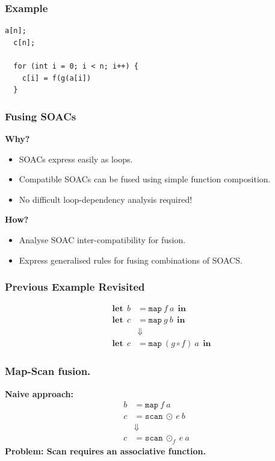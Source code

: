 \documentclass{beamer}
\newcommand\lett{\phantom{-}\:\:\mathbf{let}\:\:}
\newcommand\inn{\:\:\mathbf{in}\:\:}
\begin{document}
\begin{frame}[fragile]
  \frametitle{Example}
\begin{lstlisting}[caption=Producer-Consumer post-fusion.,label={lst:pc-post}] 
  a[n];
  c[n];

  for (int i = 0; i < n; i++) {
    c[i] = f(g(a[i])
  }
\end{lstlisting}
\end{frame}


\begin{frame}
  \frametitle{Fusing SOACs}

\large \textbf{Why?}
  \begin{itemize}
  \item SOACs express easily as loops.
  \item Compatible SOACs can be fused using simple function composition.
  \item No difficult loop-dependency analysis required!
  \end{itemize}

\large \textbf{How?}
\begin{itemize}
\item Analyse SOAC inter-compatibility for fusion.
\item Express generalised rules for fusing combinations of SOACS.
\end{itemize}
\end{frame}

\begin{frame}
  \frametitle{Previous Example Revisited}
  \begin{align*}
   \lett b &= \mathtt{map} \: f \: a \inn \\
   \lett c &= \mathtt{map} \: g \: b \inn \\
    &\Downarrow \\
    \lett c &= \mathtt{map} \: (g \circ f) \: a \inn 
 \end{align*}
\end{frame}

\begin{frame}
  \frametitle{Map-Scan fusion.}
\large \textbf{Naive approach:}
\begin{align*}
  b &= \mathtt{map} \: f \: a \\
  c &= \mathtt{scan} \: \odot \: e \: b \\
    &\Downarrow \\
  c &= \mathtt{scan} \: \odot_f \: e \: a
\end{align*}
\large \textbf{Problem: Scan requires an associative function.}
\end{frame}
\end{document}

